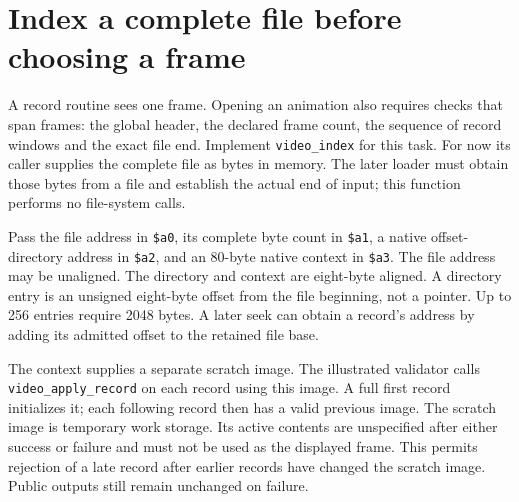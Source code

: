 \section{Index a complete file before choosing a frame}
A record routine sees one frame. Opening an animation also requires checks that
span frames: the global header, the declared frame count, the sequence of record
windows and the exact file end. Implement \texttt{video\_index} for this task.
For now its caller supplies the complete file as bytes in memory. The later
loader must obtain those bytes from a file and establish the actual end of input;
this function performs no file-system calls.

Pass the file address in \texttt{\$a0}, its complete byte count in
\texttt{\$a1}, a native offset-directory address in \texttt{\$a2}, and an
80-byte native context in \texttt{\$a3}. The file address may be unaligned.
The directory and context are eight-byte aligned. A directory entry is an
unsigned eight-byte offset from the file beginning, not a pointer. Up to 256
entries require 2048 bytes. A later seek can obtain a record's address by adding
its admitted offset to the retained file base.

The context supplies a separate scratch image. The illustrated validator calls
\texttt{video\_apply\_record} on each record using this image. A full first
record initializes it; each following record then has a valid previous image.
The scratch image is temporary work storage. Its active contents are unspecified
after either success or failure and must not be used as the displayed frame.
This permits rejection of a late record after earlier records have changed the
scratch image. Public outputs still remain unchanged on failure.

